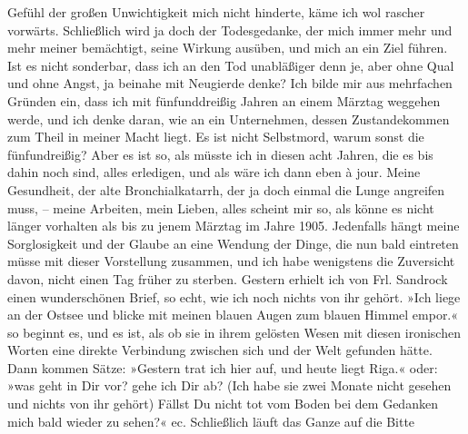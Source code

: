 \begin{ledgroupsized}[t]{13cm}
               Gefühl der großen Unwichtigkeit mich nicht hinderte, käme ich wol rascher vorwärts.
               Schließlich wird ja doch der Todesgedanke, der mich immer mehr und mehr meiner
               bemächtigt, seine Wirkung ausüben, und mich an ein Ziel führen. Ist es nicht
               sonderbar, dass ich an den Tod unabläßiger denn je, aber ohne Qual und ohne Angst, ja
               beinahe mit Neugierde denke? Ich bilde mir aus mehrfachen Gründen ein, dass ich mit
               fünfunddreißig Jahren an einem Märztag weggehen werde, und ich denke daran, wie an
               ein Unternehmen, dessen Zustandekommen zum Theil in meiner Macht liegt. Es ist nicht
               Selbstmord, warum sonst die fünfundreißig? Aber es ist so, als müsste ich in diesen
                  {\pb}acht Jahren, die es bis
               dahin noch sind, alles erledigen, und als wäre ich dann eben à jour. Meine
               Gesundheit, der alte Bronchialkatarrh, der ja doch einmal die Lunge angreifen muss, –
               meine Arbeiten, mein Lieben, alles scheint mir so, als könne es nicht länger
               vorhalten als bis zu jenem Märztag im Jahre 1905. Jedenfalls hängt meine
               Sorglosigkeit und der Glaube an eine Wendung der Dinge, die nun bald eintreten müsse
               mit dieser Vorstellung zusammen, und ich habe wenigstens die Zuversicht davon, nicht
               einen Tag früher zu sterben. \pend
           \pstart
           Gestern erhielt ich von Frl. Sandrock einen
               wunderschönen Brief, so echt, wie ich noch nichts von ihr gehört. »Ich liege an der
                  Ostsee und blicke mit meinen blauen Augen
               zum blauen Himmel empor.« so beginnt es, und es ist, als ob sie in ihrem gelösten
               Wesen mit diesen ironischen Worten eine direkte Verbindung zwischen sich und der Welt
               gefunden hätte. Dann kommen Sätze: »Gestern trat ich hier auf, und heute liegt Riga\label{K_L03266-1v}\label{K_L03266-1h}.« oder: »was geht in Dir vor? gehe ich {\pb}Dir ab? (Ich habe sie zwei
               Monate nicht gesehen und nichts von ihr gehört) Fällst Du nicht tot vom Boden bei dem
               Gedanken mich bald wieder zu sehen?« ec. Schließlich läuft das Ganze auf die Bitte

\end{ledgroupsized}
